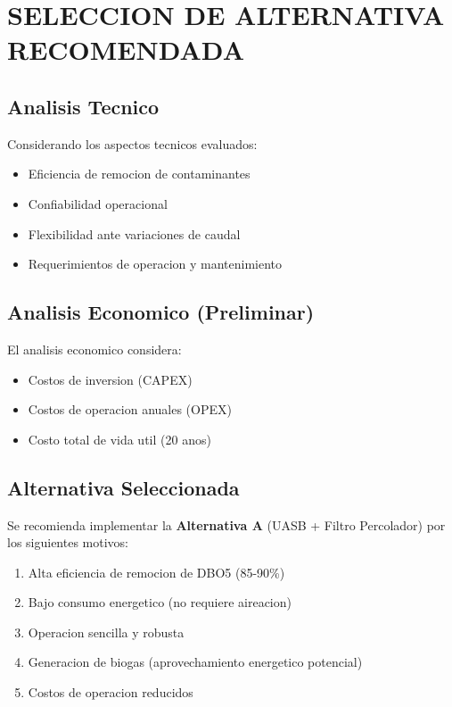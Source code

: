 \documentclass[12pt,a4paper]{article}
\begin{document}
\newpage
\section{SELECCION DE ALTERNATIVA RECOMENDADA}

\subsection{Analisis Tecnico}

Considerando los aspectos tecnicos evaluados:
\begin{itemize}
    \item Eficiencia de remocion de contaminantes
    \item Confiabilidad operacional
    \item Flexibilidad ante variaciones de caudal
    \item Requerimientos de operacion y mantenimiento
\end{itemize}

\subsection{Analisis Economico (Preliminar)}

El analisis economico considera:
\begin{itemize}
    \item Costos de inversion (CAPEX)
    \item Costos de operacion anuales (OPEX)
    \item Costo total de vida util (20 anos)
\end{itemize}

\subsection{Alternativa Seleccionada}

\begin{tcolorbox}[colback=verdeagua!10,colframe=azuloscuro,title=\textbf{Recomendacion}]
Se recomienda implementar la \textbf{Alternativa A} (UASB + Filtro Percolador) 
por los siguientes motivos:
\begin{enumerate}
    \item Alta eficiencia de remocion de DBO5 (85-90\%)
    \item Bajo consumo energetico (no requiere aireacion)
    \item Operacion sencilla y robusta
    \item Generacion de biogas (aprovechamiento energetico potencial)
    \item Costos de operacion reducidos
\end{enumerate}
\end{tcolorbox}
\end{document}
